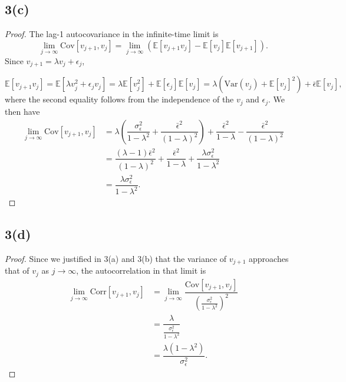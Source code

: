 \documentclass[11pt]{article}
\begin{document}
\subsection*{3(c)} \begin{proof}The lag-1 autocovariance in the infinite-time limit is 
\[ \lim\limits_{j\to\infty}\mathrm{Cov}[v_{j+1},v_j] =\lim\limits_{j\to\infty}\left( \mathbb{E}[v_{j+1}v_j] -\mathbb{E}[v_j]\mathbb{E}[v_{j+1}]\right). \tag{4}
\] Since $v_{j+1} = \lambda v_j + \epsilon_j$, 

\[
\mathbb{E}[v_{j+1}v_j] = \mathbb{E}[\lambda v_j^2 + \epsilon_j v_j] = \lambda\mathbb{E}[v_j^2] + \mathbb{E}[\epsilon_j]\mathbb{E}[v_j] = \lambda (\mathrm{Var}(v_j) + \mathbb{E}[v_j]^2) + \bar{\epsilon}\mathbb{E}[v_j],\tag{5} \]
where the second equality follows from the independence of the $v_j$ and $\epsilon_j$. We then have 
\[
\begin{aligned}
\lim\limits_{j\to\infty}\mathrm{Cov}[v_{j+1},v_j] &= \lambda\left(\dfrac{\sigma_{\epsilon}^2}{1-\lambda^2} + \dfrac{\bar{\epsilon}^2}{(1-\lambda)^2}\right) + \dfrac{\bar{\epsilon}^2}{1-\lambda} -   \dfrac{\bar{\epsilon}^2}{(1-\lambda)^2}\\
&= \dfrac{(\lambda - 1)\bar{\epsilon}^2}{(1-\lambda)^2} + \dfrac{\bar{\epsilon}^2}{1-\lambda} + \dfrac{\lambda\sigma_{\epsilon}^2}{1-\lambda^2}\\
&= \dfrac{\lambda\sigma_{\epsilon}^2}{1-\lambda^2}.
\end{aligned}
\] \qedhere
\end{proof}
\subsection*{3(d)}\begin{proof} Since we justified in 3(a) and 3(b) that the variance of $v_{j+1}$ approaches that of $v_j$ as $j\to\infty$, the autocorrelation in that limit is 
\[
\begin{aligned}
\lim\limits_{j\to\infty}\mathrm{Corr}[v_{j+1},v_j]  &= \lim\limits_{j\to\infty}\dfrac{\mathrm{Cov}[v_{j+1},v_j]}{\left(\frac{\sigma_{\epsilon}^2}{1-\lambda^2}\right)^2}\\
 &= \dfrac{\lambda}{\frac{\sigma_{\epsilon}^2}{1-\lambda^2}}\\
 &= \dfrac{\lambda(1-\lambda^2)}{\sigma_{\epsilon}^2}.
 \end{aligned}
\]
\end{proof}
\end{document}
